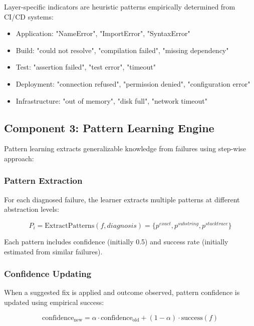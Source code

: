 \documentclass[11pt]{article}
\begin{document}
Layer-specific indicators are heuristic patterns empirically determined from CI/CD systems:
\begin{itemize}
    \item Application: "NameError", "ImportError", "SyntaxError"
    \item Build: "could not resolve", "compilation failed", "missing dependency"
    \item Test: "assertion failed", "test error", "timeout"
    \item Deployment: "connection refused", "permission denied", "configuration error"
    \item Infrastructure: "out of memory", "disk full", "network timeout"
\end{itemize}

\subsection{Component 3: Pattern Learning Engine}

Pattern learning extracts generalizable knowledge from failures using step-wise approach:

\subsubsection{Pattern Extraction}

For each diagnosed failure, the learner extracts multiple patterns at different abstraction levels:

\begin{equation}
P_i = \text{ExtractPatterns}(f, diagnosis) = \{p^{exact}, p^{substring}, p^{stacktrace}\}
\end{equation}

Each pattern includes confidence (initially 0.5) and success rate (initially estimated from similar failures).

\subsubsection{Confidence Updating}

When a suggested fix is applied and outcome observed, pattern confidence is updated using empirical success:

\begin{equation}
\text{confidence}_{\text{new}} = \alpha \cdot \text{confidence}_{\text{old}} + (1-\alpha) \cdot \text{success}(f)
\end{equation}
\end{document}
